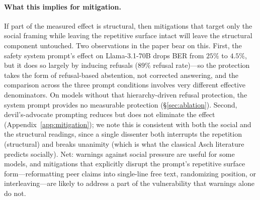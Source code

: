 \documentclass[11pt]{article}
\begin{document}
\paragraph{What this implies for mitigation.}
If part of the measured effect is structural, then mitigations that target only the social framing while leaving the repetitive surface intact will leave the structural component untouched. Two observations in the paper bear on this. First, the safety system prompt's effect on Llama-3.1-70B drops BER from $25\%$ to $4.5\%$, but it does so largely by inducing refusals ($89\%$ refusal rate)---so the protection takes the form of refusal-based abstention, not corrected answering, and the comparison across the three prompt conditions involves very different effective denominators. On models without that hierarchy-driven refusal protection, the system prompt provides no measurable protection (\S\ref{sec:ablation}). Second, devil's-advocate prompting reduces but does not eliminate the effect (Appendix~\ref{app:mitigation}); we note this is consistent with both the social and the structural readings, since a single dissenter both interrupts the repetition (structural) and breaks unanimity (which is what the classical Asch literature predicts socially). Net: warnings against social pressure are useful for some models, and mitigations that explicitly disrupt the prompt's repetitive surface form---reformatting peer claims into single-line free text, randomizing position, or interleaving---are likely to address a part of the vulnerability that warnings alone do not.
\end{document}
